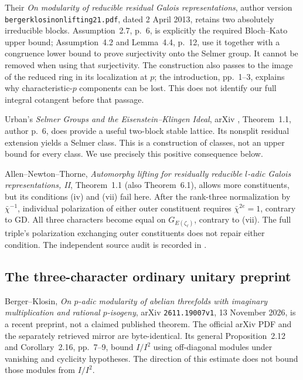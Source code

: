 \documentclass[11pt,a4paper]{article}
\theoremstyle{definition}
\begin{document}
Their \emph{On modularity of reducible residual Galois
representations}, author version
\texttt{bergerklosinonlifting21.pdf}, dated 2 April 2013,
retains two absolutely irreducible blocks.  Assumption~2.7,
p.~6, is explicitly the required Bloch--Kato upper bound;
Assumption~4.2 and Lemma~4.4, p.~12, use it together with
a congruence lower bound to prove surjectivity onto the
Selmer group.  It cannot be removed when using that
surjectivity.  The construction also passes to the image
of the reduced ring in its localization at $p$; the
introduction, pp.~1--3, explains why characteristic-$p$
components can be lost.  This does not identify our full
integral cotangent before that passage.

Urban's \emph{Selmer Groups and the Eisenstein--Klingen
Ideal}, arXiv , Theorem~1.1,
author p.~6, does provide a useful two-block stable
lattice.  Its nonsplit residual extension yields a
Selmer class.  This is a construction of classes, not
an upper bound for every class.  We use precisely this
positive consequence below.

Allen--Newton--Thorne, \emph{Automorphy lifting for
residually reducible $l$-adic Galois representations, II},
Theorem~1.1 (also Theorem~6.1), allows more constituents,
but its conditions (iv) and (vii) fail here.  After the
rank-three normalization by $\bar\chi^{-1}$, individual
polarization of either outer constituent requires
$\bar\chi^{2e}=1$, contrary to GD.  All three characters
become equal on $G_{E(\zeta_\ell)}$, contrary to (vii).
The full triple's polarization exchanging outer
constituents does not repair either condition.  The
independent source audit is recorded in
.

\subsection{The three-character ordinary unitary preprint}

Berger--Klosin, \emph{On $p$-adic modularity of abelian
threefolds with imaginary multiplication and rational
$p$-isogeny}, arXiv \texttt{2611.19007v1}, 13 November
2026, is a recent preprint, not a claimed published
theorem.  The official arXiv PDF and the separately
retrieved mirror are byte-identical.  Its general
Proposition~2.12 and Corollary~2.16, pp.~7--9, bound
$I/I^2$ using off-diagonal modules under vanishing and
cyclicity hypotheses.  The direction of this estimate
does not bound those modules from $I/I^2$.
\end{document}
